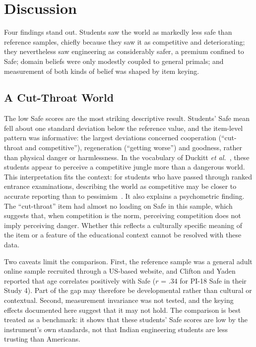 \documentclass[journal,a4paper]{IEEEtran}
\begin{document}
\section{Discussion}

Four findings stand out. Students saw the world as markedly less safe than reference samples, chiefly because they saw it as competitive and deteriorating; they nevertheless saw engineering as considerably safer, a premium confined to Safe; domain beliefs were only modestly coupled to general primals; and measurement of both kinds of belief was shaped by item keying.

\subsection{A Cut-Throat World}

The low Safe scores are the most striking descriptive result. Students' Safe mean fell about one standard deviation below the reference value, and the item-level pattern was informative: the largest deviations concerned cooperation (``cut-throat and competitive''), regeneration (``getting worse'') and goodness, rather than physical danger or harmlessness. In the vocabulary of Duckitt \emph{et al.}~\cite{duckitt2002}, these students appear to perceive a competitive jungle more than a dangerous world. This interpretation fits the context: for students who have passed through ranked entrance examinations, describing the world as competitive may be closer to accurate reporting than to pessimism~\cite{pienyu2024,subramanian2019}. It also explains a psychometric finding. The ``cut-throat'' item had almost no loading on Safe in this sample, which suggests that, when competition is the norm, perceiving competition does not imply perceiving danger. Whether this reflects a culturally specific meaning of the item or a feature of the educational context cannot be resolved with these data.

Two caveats limit the comparison. First, the reference sample was a general adult online sample recruited through a US-based website, and Clifton and Yaden~\cite{cliftonyaden2021} reported that age correlates positively with Safe ($r$ = .34 for PI-18 Safe in their Study 4). Part of the gap may therefore be developmental rather than cultural or contextual. Second, measurement invariance was not tested, and the keying effects documented here suggest that it may not hold. The comparison is best treated as a benchmark: it shows that these students' Safe scores are low by the instrument's own standards, not that Indian engineering students are less trusting than Americans.
\end{document}
